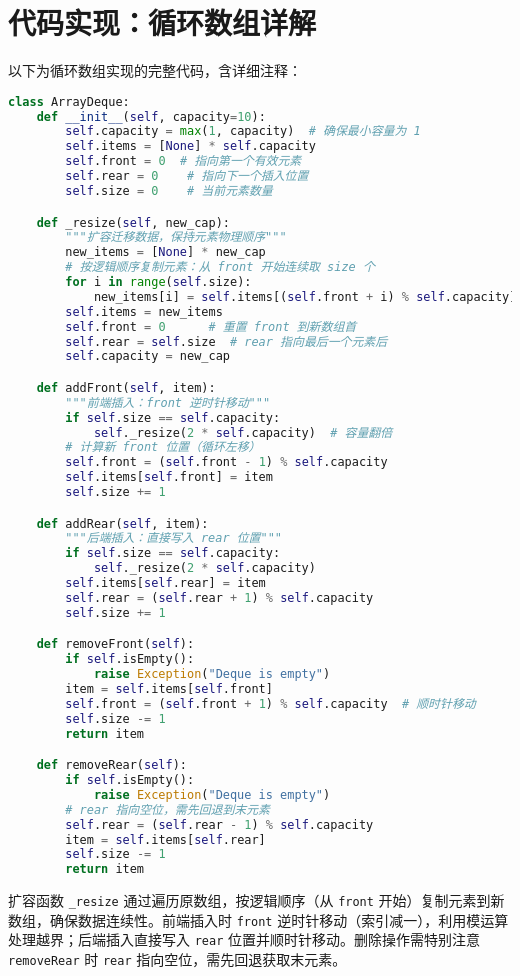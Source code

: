 \chapter{代码实现：循环数组详解}
以下为循环数组实现的完整代码，含详细注释：\par
\begin{lstlisting}[language=python]
class ArrayDeque:
    def __init__(self, capacity=10):
        self.capacity = max(1, capacity)  # 确保最小容量为 1
        self.items = [None] * self.capacity
        self.front = 0  # 指向第一个有效元素
        self.rear = 0    # 指向下一个插入位置
        self.size = 0    # 当前元素数量

    def _resize(self, new_cap):
        """扩容迁移数据，保持元素物理顺序"""
        new_items = [None] * new_cap
        # 按逻辑顺序复制元素：从 front 开始连续取 size 个
        for i in range(self.size):
            new_items[i] = self.items[(self.front + i) % self.capacity]
        self.items = new_items
        self.front = 0      # 重置 front 到新数组首
        self.rear = self.size  # rear 指向最后一个元素后
        self.capacity = new_cap

    def addFront(self, item):
        """前端插入：front 逆时针移动"""
        if self.size == self.capacity:
            self._resize(2 * self.capacity)  # 容量翻倍
        # 计算新 front 位置（循环左移）
        self.front = (self.front - 1) % self.capacity
        self.items[self.front] = item
        self.size += 1

    def addRear(self, item):
        """后端插入：直接写入 rear 位置"""
        if self.size == self.capacity:
            self._resize(2 * self.capacity)
        self.items[self.rear] = item
        self.rear = (self.rear + 1) % self.capacity
        self.size += 1

    def removeFront(self):
        if self.isEmpty():
            raise Exception("Deque is empty")
        item = self.items[self.front]
        self.front = (self.front + 1) % self.capacity  # 顺时针移动
        self.size -= 1
        return item

    def removeRear(self):
        if self.isEmpty():
            raise Exception("Deque is empty")
        # rear 指向空位，需先回退到末元素
        self.rear = (self.rear - 1) % self.capacity
        item = self.items[self.rear]
        self.size -= 1
        return item
\end{lstlisting}
扩容函数 \texttt{\_{}resize} 通过遍历原数组，按逻辑顺序（从 \texttt{front} 开始）复制元素到新数组，确保数据连续性。前端插入时 \texttt{front} 逆时针移动（索引减一），利用模运算处理越界；后端插入直接写入 \texttt{rear} 位置并顺时针移动。删除操作需特别注意 \texttt{removeRear} 时 \texttt{rear} 指向空位，需先回退获取末元素。\par
